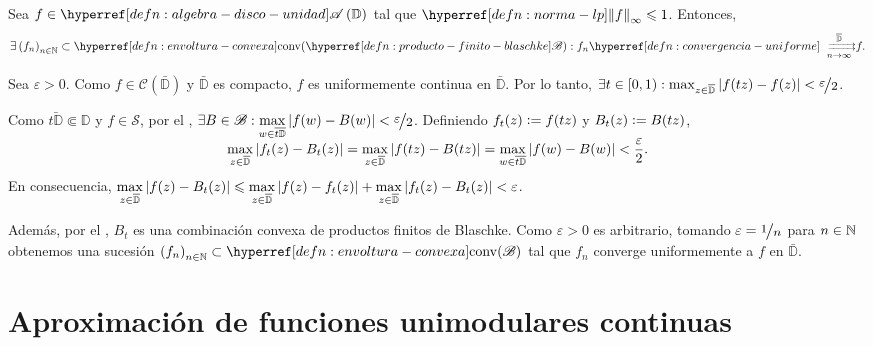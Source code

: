 \begin{teo}[Fisher]\label{teo:fisher-aproximacion-algebra-disco-conv-prod-finito-blaschke}
    Sea $f \in \exhyperref[defn:algebra-disco-unidad]{algebra-disco-unidad}{\mathscr{A}} \left(\mathbb{D} \right)$ tal que $\exhyperref[defn:norma-lp]{norma-lp}{\norm{f}_{\infty}} \leq 1$. Entonces,
    \[
    \exists \left(f_n\right)_{n\in \N} \subset \exhyperref[defn:envoltura-convexa]{envoltura-convexa}{\operatorname{conv}} (\exhyperref[defn:producto-finito-blaschke]{producto-finito-blaschke}{\mathscr{B}}) : f_n \exhyperref[defn:convergencia-uniforme]{convergencia-uniforme}{\xrightrightarrows[n \to \infty]{\bar{\mathbb{D}}}} f.
    \]
\end{teo}
\begin{dem}
    Sea $\varepsilon > 0$. Como $f \in \mathcal{C} \left(\bar{\mathbb{D}}\right)$ y $\bar{\mathbb{D}}$ es compacto, $f$ es uniformemente continua en $\bar{\mathbb{D}}$. Por lo tanto, $\exists t \in [0, 1) : \max_{z \in \bar{\mathbb{D}}} \abs{f(tz) - f(z)} < \sfrac{\varepsilon}{2}$.

    Como $\bar{t\mathbb{D}} \Subset \mathbb{D}$ y $f \in \mathscr{S}$, por el , $\exists B \in \mathscr{B} :\ds \smash{\max_{w \in \bar{t\mathbb{D}}} \abs{f(w) - B(w)} < \sfrac{\varepsilon}{2}}$. Definiendo $f_t(z) \vcentcolon= f(tz)$ y $B_t(z) \vcentcolon= B(tz)$,
    \[
    \max_{z \in \overline{\mathbb{D}}} \left|f_t(z) - B_t(z)\right| = \max_{z \in \overline{\mathbb{D}}} \left|f(tz) - B(tz)\right| = \max_{w \in \overline{t\mathbb{D}}} \left|f(w) - B(w)\right| < \frac{\varepsilon}{2}.
    \]
    En consecuencia, $\displaystyle \max_{z \in \overline{\mathbb{D}}} \left|f(z) - B_t(z)\right| \leqslant \max_{z \in \overline{\mathbb{D}}} \left|f(z) - f_t(z)\right| + \max_{z \in \overline{\mathbb{D}}} \left|f_t(z) - B_t(z)\right| < \varepsilon$.

    Además, por el , $B_t$ es una combinación convexa de productos finitos de Blaschke. Como $\varepsilon > 0$ es arbitrario, tomando $\varepsilon = \sfrac{1}{n}$ para $n \in \mathbb{N}$ obtenemos una sucesión $\left(f_n\right)_{n \in \N} \subset \exhyperref[defn:envoltura-convexa]{envoltura-convexa}{\operatorname{conv}}(\mathscr{B})$ tal que $f_n$ converge uniformemente a $f$ en $\bar{\mathbb{D}}$.\hfill\qedsymbol
\end{dem}

\section{Aproximación de funciones unimodulares continuas}

